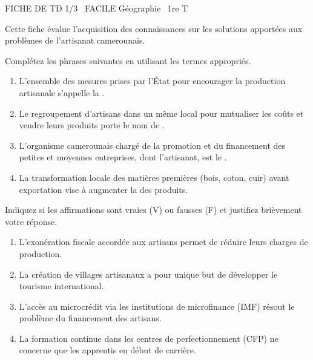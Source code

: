 \documentclass[11pt]{article}
\begin{document}
\begin{tcolorbox}[enhanced,colback=popink,colframe=popink,arc=10pt,boxrule=0pt,left=12pt,right=12pt,top=9pt,bottom=9pt]
{\color{white}\popxbold\small FICHE DE TD 1/3 \textbullet\ FACILE \hfill Géographie \textbullet\ 1re T\par}
\end{tcolorbox}
\vspace{4pt}
Cette fiche évalue l'acquisition des connaissances sur les solutions apportées aux problèmes de l'artisanat camerounais.

\begin{exercice}
Complétez les phrases suivantes en utilisant les termes appropriés.
\begin{enumerate}
    \item L'ensemble des mesures prises par l'État pour encourager la production artisanale s'appelle la \underline{\hspace{5cm}}.
    \item Le regroupement d'artisans dans un même local pour mutualiser les coûts et vendre leurs produits porte le nom de \underline{\hspace{5cm}}.
    \item L'organisme camerounais chargé de la promotion et du financement des petites et moyennes entreprises, dont l'artisanat, est le \underline{\hspace{5cm}}.
    \item La transformation locale des matières premières (bois, coton, cuir) avant exportation vise à augmenter la \underline{\hspace{5cm}} des produits.
\end{enumerate}
\end{exercice}

\begin{exercice}
Indiquez si les affirmations sont vraies (V) ou fausses (F) et justifiez brièvement votre réponse.
\begin{enumerate}
    \item L'exonération fiscale accordée aux artisans permet de réduire leurs charges de production.
    \item La création de villages artisanaux a pour unique but de développer le tourisme international.
    \item L'accès au microcrédit via les institutions de microfinance (IMF) résout le problème du financement des artisans.
    \item La formation continue dans les centres de perfectionnement (CFP) ne concerne que les apprentis en début de carrière.
\end{enumerate}
\end{exercice}
\end{document}
